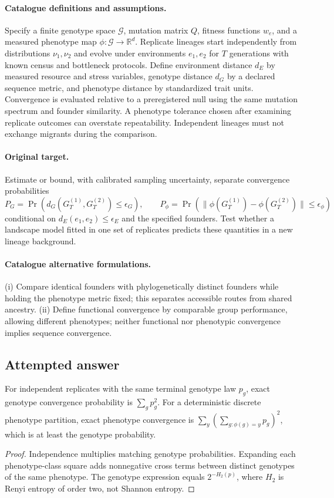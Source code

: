 \documentclass[11pt]{article}
\begin{document}
\paragraph{Catalogue definitions and assumptions.}
Specify a finite genotype space $\mathcal G$, mutation matrix $Q$, fitness functions $w_e$, and a measured phenotype map $\phi:\mathcal G\to\mathbb{R}^d$. Replicate lineages start independently from distributions $\nu_1,\nu_2$ and evolve under environments $e_1,e_2$ for $T$ generations with known census and bottleneck protocols. Define environment distance $d_E$ by measured resource and stress variables, genotype distance $d_G$ by a declared sequence metric, and phenotype distance by standardized trait units. Convergence is evaluated relative to a preregistered null using the same mutation spectrum and founder similarity. A phenotype tolerance chosen after examining replicate outcomes can overstate repeatability. Independent lineages must not exchange migrants during the comparison.
\paragraph{Original target.}
Estimate or bound, with calibrated sampling uncertainty, separate convergence probabilities
\[
 P_G=\Pr(d_G(G_T^{(1)},G_T^{(2)})\le\epsilon_G),\qquad
 P_\phi=\Pr(\|\phi(G_T^{(1)})-\phi(G_T^{(2)})\|\le\epsilon_\phi)
\]
conditional on $d_E(e_1,e_2)\le\epsilon_E$ and the specified founders. Test whether a landscape model fitted in one set of replicates predicts these quantities in a new lineage background.
\paragraph{Catalogue alternative formulations.}
(i) Compare identical founders with phylogenetically distinct founders while holding the phenotype metric fixed; this separates accessible routes from shared ancestry. (ii) Define functional convergence by comparable group performance, allowing different phenotypes; neither functional nor phenotypic convergence implies sequence convergence.
\subsection{Attempted answer}
\begin{proposition}
For independent replicates with the same terminal genotype law $p_g$, exact genotype convergence probability is $\sum_gp_g^2$. For a deterministic discrete phenotype partition, exact phenotype convergence is $\sum_y(\sum_{g:\phi(g)=y}p_g)^2$, which is at least the genotype probability.
\end{proposition}
\begin{proof}
Independence multiplies matching genotype probabilities. Expanding each phenotype-class square adds nonnegative cross terms between distinct genotypes of the same phenotype. The genotype expression equals $2^{-H_2(p)}$, where $H_2$ is Renyi entropy of order two, not Shannon entropy.
\end{proof}
\end{document}
